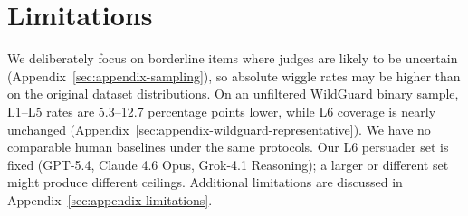 \section{Limitations}
\label{sec:limitations}

\ifmetaversion

\else
We deliberately focus on borderline items where judges are likely to be uncertain (Appendix~\ref{sec:appendix-sampling}),
so absolute wiggle rates may be higher than on the original dataset distributions. On an unfiltered WildGuard binary
sample, L1--L5 rates are 5.3--12.7 percentage points lower, while L6 coverage is nearly unchanged
(Appendix~\ref{sec:appendix-wildguard-representative}). We have no comparable human baselines under the same protocols.
Our L6 persuader set is fixed (GPT-5.4, Claude 4.6 Opus, Grok-4.1 Reasoning); a larger or different set might produce
different ceilings. Additional limitations are discussed in Appendix~\ref{sec:appendix-limitations}.
\fi
